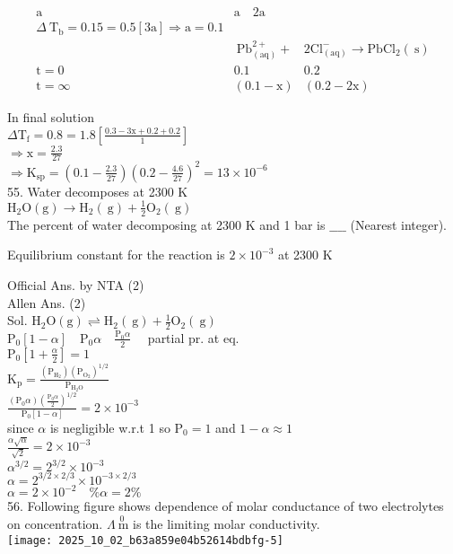 \documentclass[10pt]{article}
\begin{document}
\[
\begin{array}{lcc}
\mathrm{a} & \mathrm{a} \quad 2 \mathrm{a} \\
\Delta \mathrm{~T}_{\mathrm{b}}=0.15=0.5[3 \mathrm{a}] \Rightarrow \mathrm{a}=0.1 \\
& \mathrm{~Pb}_{(\mathrm{aq})}^{2+}+ & 2 \mathrm{Cl}_{(\mathrm{aq})}^{-} \rightarrow \mathrm{PbCl}_{2}(\mathrm{~s}) \\
\mathrm{t}=0 & 0.1 & 0.2 \\
\mathrm{t}=\infty & (0.1-\mathrm{x}) & (0.2-2 \mathrm{x})
\end{array}
\]

In final solution\\
\(\Delta \mathrm{T}_{\mathrm{f}}=0.8=1.8\left[\frac{0.3-3 \mathrm{x}+0.2+0.2}{1}\right]\)\\
\(\Rightarrow \mathrm{x}=\frac{2.3}{27}\)\\
\(\Rightarrow \mathrm{K}_{\mathrm{sp}}=\left(0.1-\frac{2.3}{27}\right)\left(0.2-\frac{4.6}{27}\right)^{2}=13 \times 10^{-6}\)\\
55. Water decomposes at 2300 K\\
\(\mathrm{H}_{2} \mathrm{O}(\mathrm{g}) \rightarrow \mathrm{H}_{2}(\mathrm{~g})+\frac{1}{2} \mathrm{O}_{2}(\mathrm{~g})\)\\
The percent of water decomposing at 2300 K and 1 bar is \(\_\_\_\_\) (Nearest integer).

Equilibrium constant for the reaction is \(2 \times 10^{-3}\) at 2300 K

Official Ans. by NTA (2)\\
Allen Ans. (2)\\
Sol. \(\mathrm{H}_{2} \mathrm{O}(\mathrm{g}) \rightleftharpoons \mathrm{H}_{2}(\mathrm{~g})+\frac{1}{2} \mathrm{O}_{2}(\mathrm{~g})\)\\
\(\mathrm{P}_{0}[1-\alpha] \quad \mathrm{P}_{0} \alpha \quad \frac{\mathrm{P}_{0} \alpha}{2} \quad\) partial pr. at eq.\\
\(\mathrm{P}_{0}\left[1+\frac{\alpha}{2}\right]=1\)\\
\(\mathrm{K}_{\mathrm{p}}=\frac{\left(\mathrm{P}_{\mathrm{H}_{2}}\right)\left(\mathrm{P}_{\mathrm{O}_{2}}\right)^{1 / 2}}{\mathrm{P}_{\mathrm{H}_{2} \mathrm{O}}}\)\\
\(\frac{\left(\mathrm{P}_{0} \alpha\right)\left(\frac{\mathrm{P}_{0} \alpha}{2}\right)^{1 / 2}}{\mathrm{P}_{0}[1-\alpha]}=2 \times 10^{-3}\)\\
since \(\alpha\) is negligible w.r.t 1 so \(\mathrm{P}_{0}=1\) and \(1-\alpha \approx 1\)\\
\(\frac{\alpha \sqrt{\alpha}}{\sqrt{2}}=2 \times 10^{-3}\)\\
\(\alpha^{3 / 2}=2^{3 / 2} \times 10^{-3}\)\\
\(\alpha=2^{3 / 2 \times 2 / 3} \times 10^{-3 \times 2 / 3}\)\\
\(\alpha=2 \times 10^{-2} \quad \% \alpha=2 \%\)\\
56. Following figure shows dependence of molar conductance of two electrolytes on concentration. \(\Lambda \stackrel{0}{\mathrm{~m}}\) is the limiting molar conductivity.\\
\texttt{[image: 2025\_10\_02\_b63a859e04b52614bdbfg-5]}
\end{document}

